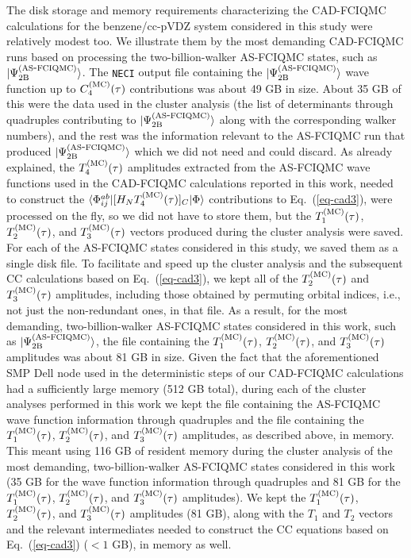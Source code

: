 \documentclass[journal=jcp,manuscript=suppinfo]{achemso}
\begin{document}
The disk storage and memory requirements characterizing the CAD-FCIQMC calculations for the benzene/cc-pVDZ
system considered in this study were relatively modest too. We illustrate them by the most
demanding CAD-FCIQMC runs based on processing the two-billion-walker AS-FCIQMC states, such as
$|\Psi_{\rm 2B}^{\rm (AS\mbox{-}FCIQMC)}\rangle$. The {\tt NECI} output file containing the
$|\Psi_{\rm 2B}^{\rm (AS\mbox{-}FCIQMC)}\rangle$ wave function up to $C_{4}^{\rm (MC)}(\tau)$
contributions was about 49 GB in size. About 35 GB of this were the data used in the cluster analysis
(the list of determinants through quadruples contributing to $|\Psi_{\rm 2B}^{\rm (AS\mbox{-}FCIQMC)}\rangle$
along with the corresponding walker numbers), and the rest was the information relevant to the AS-FCIQMC
run that produced $|\Psi_{\rm 2B}^{\rm (AS\mbox{-}FCIQMC)}\rangle$ which we did not need and could discard.
As already explained, the $T_{4}^{\rm (MC)}(\tau)$ amplitudes extracted from the AS-FCIQMC wave functions
used in the CAD-FCIQMC calculations reported in this work, needed to construct the
$\langle \Phi_{ij}^{ab} | [ H_N  T_{4}^{\rm (MC)}(\tau) ]_C | \Phi \rangle$ contributions to
Eq.\ (\ref{eq-cad3}), were processed on the fly, so we did not have to store them, but the
$T_{1}^{\rm (MC)}(\tau)$, $T_{2}^{\rm (MC)}(\tau)$, and $T_{3}^{\rm (MC)}(\tau)$ vectors
produced during the cluster analysis were saved. For each of the AS-FCIQMC states considered
in this study, we saved them as a single disk file. To facilitate and speed up the cluster
analysis and the subsequent CC calculations based on Eq.\ (\ref{eq-cad3}), we kept all of the
$T_{2}^{\rm (MC)}(\tau)$ and $T_{3}^{\rm (MC)}(\tau)$ amplitudes, including those obtained
by permuting orbital indices, i.e., not just the non-redundant ones, in that file. As a result,
for the most demanding, two-billion-walker AS-FCIQMC states considered in this work, such as
$|\Psi_{\rm 2B}^{\rm (AS\mbox{-}FCIQMC)}\rangle$, the file containing the
$T_{1}^{\rm (MC)}(\tau)$, $T_{2}^{\rm (MC)}(\tau)$, and $T_{3}^{\rm (MC)}(\tau)$ amplitudes was
about 81 GB in size. Given the fact that the aforementioned SMP Dell node used in the deterministic
steps of our CAD-FCIQMC calculations had a sufficiently large memory (512 GB total), during each
of the cluster analyses performed in this work we kept the file containing the AS-FCIQMC
wave function information through quadruples and the file containing the $T_{1}^{\rm (MC)}(\tau)$,
$T_{2}^{\rm (MC)}(\tau)$, and $T_{3}^{\rm (MC)}(\tau)$ amplitudes, as described above, in memory.
This meant using 116 GB of resident memory during the cluster analysis of the most demanding,
two-billion-walker AS-FCIQMC states considered in this work (35 GB for the wave function information
through quadruples and 81 GB for the $T_{1}^{\rm (MC)}(\tau)$, $T_{2}^{\rm (MC)}(\tau)$, and
$T_{3}^{\rm (MC)}(\tau)$ amplitudes). We kept the $T_{1}^{\rm (MC)}(\tau)$, $T_{2}^{\rm (MC)}(\tau)$,
and $T_{3}^{\rm (MC)}(\tau)$ amplitudes (81 GB), along with the $T_{1}$ and $T_{2}$ vectors and
the relevant intermediates needed to construct the CC equations based on Eq.\ (\ref{eq-cad3})
($< 1$ GB), in memory as well.
\end{document}
